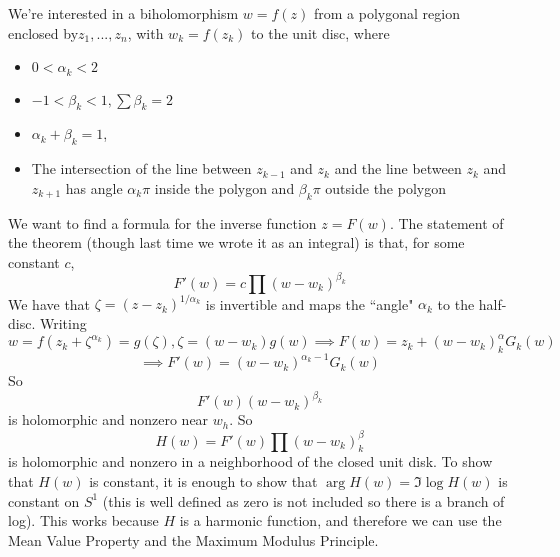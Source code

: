 \documentclass{article}
\begin{document}
We're interested in a biholomorphism \(w = f(z)\) from a polygonal region enclosed by\(z_1,...,z_n\), with \(w_k = f(z_k)\) to the unit disc, where
\begin{itemize}

  \item \(0 < \alpha_k < 2\)

  \item \(-1 < \beta_k < 1, \sum\beta_k = 2\)

  \item \(\alpha_k + \beta_k = 1\),

  \item The intersection of the line between \(z_{k - 1}\) and \(z_k\) and the line between \(z_k\) and \(z_{k + 1}\) has angle \(\alpha_k\pi\) inside the polygon and \(\beta_k\pi\) outside the polygon

\end{itemize}
We want to find a formula for the inverse function \(z = F(w)\). The statement of the theorem (though last time we wrote it as an integral) is that, for some constant \(c\),
\begin{equation}F'(w) = c\prod(w - w_k)^{\beta_k}\end{equation}
We have that \(\zeta = (z - z_k)^{1/\alpha_k}\) is invertible and maps the ``angle" \(\alpha_k\) to the half-disc. Writing
\begin{equation}w = f(z_k + \zeta^{\alpha_k}) = g(\zeta), \zeta = (w - w_k)g(w) \implies F(w) = z_k + (w - w_k)^\alpha_kG_k(w)\end{equation}
\begin{equation}\implies F'(w) = (w - w_k)^{\alpha_k - 1}G_k(w)\end{equation}
So
\begin{equation}F'(w)(w - w_k)^{\beta_k}\end{equation}
is holomorphic and nonzero near \(w_h\). So
\begin{equation}H(w) = F'(w)\prod(w - w_k)^\beta_k\end{equation}
is holomorphic and nonzero in a neighborhood of the closed unit disk. To show that \(H(w)\) is constant, it is enough to show that \(\arg H(w) = \Im\log H(w)\) is constant on \(S^1\) (this is well defined as zero is not included so there is a branch of log). This works because \(H\) is a harmonic function, and therefore we can use the Mean Value Property and the Maximum Modulus Principle.
\end{document}

